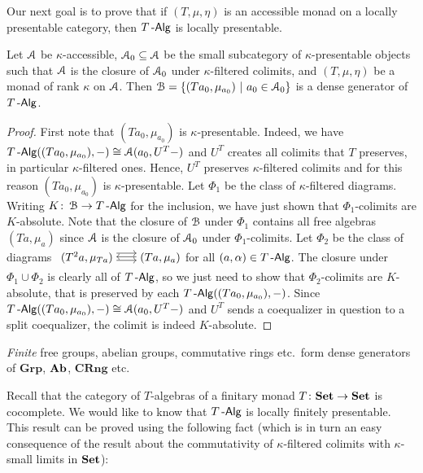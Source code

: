 \documentclass[a4paper,11pt,oneside,openany]{scrbook}
\begin{document}
Our next goal is to prove that if $(T,\mu,\eta)$ is an accessible monad on a locally presentable category, then $T\operatorname{-\mathsf{Alg}}$ is locally presentable.
\begin{prop}
	Let $\operatorname{\mathcal{A}}$ be $\kappa$-accessible, $\operatorname{\mathcal{A}}_0\subseteq\operatorname{\mathcal{A}}$ be the small subcategory of $\kappa$-presentable objects such that $\operatorname{\mathcal{A}}$ is the closure of $\operatorname{\mathcal{A}}_0$ under $\kappa$-filtered colimits, and $(T,\mu,\eta)$ be a monad of rank $\kappa$ on $\operatorname{\mathcal{A}}$. Then $\operatorname{\mathcal{B}}=\{ (Ta_0,\mu_{a_0})\ | \ a_0\in\operatorname{\mathcal{A}}_0 \}$ is a dense generator of $T\operatorname{-\mathsf{Alg}}$.
\end{prop}
\begin{proof}
	First note that $(Ta_0,\mu_{a_0})$ is $\kappa$-presentable. Indeed, we have
    $T\operatorname{-\mathsf{Alg}}((Ta_0,\mu_{a_0}),-)\cong\operatorname{\mathcal{A}}(a_0,U^T-)$ and $U^T$ creates all colimits
    that $T$ preserves, in particular $\kappa$-filtered ones. Hence, $U^T$
    preserves $\kappa$-filtered colimits and for this reason $(Ta_0,\mu_{a_0})$
    is $\kappa$-presentable. Let $\Phi_1$  be the class of $\kappa$-filtered
    diagrams. Writing $K\colon\operatorname{\mathcal{B}}\to T\operatorname{-\mathsf{Alg}}$ for the inclusion, we have just shown
    that $\Phi_1$-colimits are $K$-absolute. Note that the closure of $\operatorname{\mathcal{B}}$ under
    $\Phi_1$ contains all free algebras $(Ta,\mu_a)$ since $\operatorname{\mathcal{A}}$ is the closure
    of $\operatorname{\mathcal{A}}_0$ under $\Phi_1$-colimits. Let $\Phi_2$ be the class of diagrams
    $\begin{tikzcd}
	        (T^2a,\mu_{Ta})\hspace{-1.5mm}\arrow[r, shift right=.5ex, shorten <= .3em, shorten >= .3em]  \arrow[r, shift left=1ex, shorten <= .3em, shorten >= .3em] & \hspace{-1.5mm}(Ta,\mu_a)\arrow[l, shift right=.25ex, shorten <=.3em, shorten >=.3em]
		\end{tikzcd}\hspace{-1.5mm}$ for all $(a,\alpha)\in T\operatorname{-\mathsf{Alg}}$. The closure
        under $\Phi_1\cup\Phi_2$ is clearly all of $T\operatorname{-\mathsf{Alg}}$, so we just need to
        show that $\Phi_2$-colimits are $K$-absolute, that is preserved by each
        $T\operatorname{-\mathsf{Alg}}((Ta_0,\mu_{a_0}),-)$. Since
        $T\operatorname{-\mathsf{Alg}}((Ta_0,\mu_{a_0}),-)\cong\operatorname{\mathcal{A}}(a_0, U^T-)$ and $U^T$ sends a
        coequalizer in question to a split coequalizer, the colimit is indeed
        $K$-absolute.
\end{proof}
\begin{exmp}
	\emph{Finite} free groups, abelian groups, commutative rings etc.\ form dense generators of $\mathbf{Grp}$, ${\normalfont\textbf{Ab}}$, $\mathbf{CRng}$ etc.
\end{exmp}
Recall that the category of $T$-algebras of a finitary monad $T\colon{\normalfont\textbf{Set}}\to{\normalfont\textbf{Set}}$ is cocomplete. We would like to know that $T\operatorname{-\mathsf{Alg}}$ is locally finitely presentable. This result can be proved using the following fact (which is in turn an easy consequence of the result about the commutativity of $\kappa$-filtered colimits with $\kappa$-small limits in ${\normalfont\textbf{Set}}$):
\end{document}
